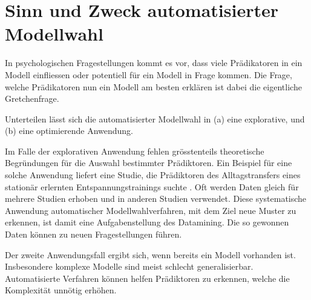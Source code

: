 \section{Sinn und Zweck automatisierter Modellwahl}
In psychologischen Fragestellungen kommt es vor, dass viele Prädikatoren in ein Modell einfliessen oder potentiell für ein Modell in Frage kommen.
Die Frage, welche Prädikatoren nun ein Modell am besten erklären ist dabei die eigentliche Gretchenfrage. 

Unterteilen lässt sich die automatisierter Modellwahl in (a) eine explorative, und (b) eine optimierende Anwendung. 

Im Falle der explorativen Anwendung fehlen grösstenteils theoretische Begründungen für die Auswahl bestimmter Prädiktoren. Ein Beispiel für eine solche Anwendung liefert eine Studie, die Prädiktoren des Alltagstransfers eines stationär erlernten Entspannungstrainings suchte \cite{023755520080101}.
Oft werden Daten gleich für mehrere Studien erhoben und in anderen Studien verwendet.
Diese systematische Anwendung automatischer Modellwahlverfahren, mit dem Ziel neue Muster zu erkennen, ist damit eine Aufgabenstellung des Datamining. 
Die so gewonnen Daten können zu neuen Fragestellungen führen. 

Der zweite Anwendungsfall ergibt sich, wenn bereits ein Modell vorhanden ist. Insbesondere komplexe Modelle sind meist schlecht generalisierbar. Automatisierte Verfahren können  helfen Prädiktoren zu erkennen, welche die Komplexität unnötig erhöhen.